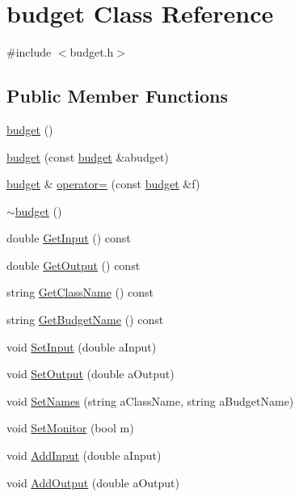 \hypertarget{classbudget}{
\section{budget Class Reference}
\label{classbudget}
}


{\ttfamily \#include $<$budget.h$>$}\subsection*{Public Member Functions}
\begin{DoxyCompactItemize}
\item 
\hyperlink{classbudget_aba8b6c695070f8943835fed016e88e89}{budget} ()
\item 
\hyperlink{classbudget_aecc92930fcb6f7f9c3fb3ea1ba7f12c8}{budget} (const \hyperlink{classbudget}{budget} \&abudget)
\item 
\hyperlink{classbudget}{budget} \& \hyperlink{classbudget_a5a09b3d53e4bb109f1413b99a634b55d}{operator=} (const \hyperlink{classbudget}{budget} \&f)
\item 
\hyperlink{classbudget_a449b93cd2025dabca2678109e890eb6f}{$\sim$budget} ()
\item 
double \hyperlink{classbudget_a50d818bbe5fe4e3d8175587633ba0846}{GetInput} () const 
\item 
double \hyperlink{classbudget_abbb3f94e526750daf8588055dab4b7e7}{GetOutput} () const 
\item 
string \hyperlink{classbudget_ad63e9d83d05c5a4ff9700a1a04715f68}{GetClassName} () const 
\item 
string \hyperlink{classbudget_ab544dc2df850963087b71d1d1781fa5a}{GetBudgetName} () const 
\item 
void \hyperlink{classbudget_a885260b83f245dee43a1e6ee70a4c68d}{SetInput} (double aInput)
\item 
void \hyperlink{classbudget_a28fc928b65aef6475ad0dee374bbb7f2}{SetOutput} (double aOutput)
\item 
void \hyperlink{classbudget_ada0ca75f0dd9d8a6d0dfd5fcbd666653}{SetNames} (string aClassName, string aBudgetName)
\item 
void \hyperlink{classbudget_a53c534dce354449261700e9c295d7e7e}{SetMonitor} (bool m)
\item 
void \hyperlink{classbudget_ad619d773e77931df0435e8c08314f68e}{AddInput} (double aInput)
\item 
void \hyperlink{classbudget_a47bfa9740186f2be18a10dd3423a5eea}{AddOutput} (double aOutput)
\item 

\end{DoxyCompactItemize}
